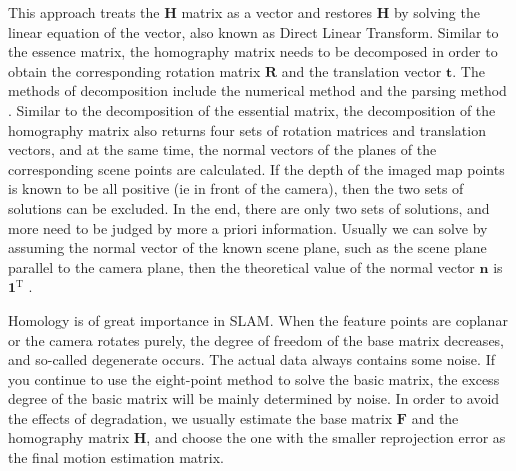 This approach treats the $\bm{H}$ matrix as a vector and restores $\bm{H}$ by solving the linear equation of the vector, also known as Direct Linear Transform. Similar to the essence matrix, the homography matrix needs to be decomposed in order to obtain the corresponding rotation matrix $\bm{R}$ and the translation vector $\bm{t}$. The methods of decomposition include the numerical method \textsuperscript{\cite{faugeras1988motion, Zhang1996}} and the parsing method \textsuperscript{\cite{malis2007deeper}}. Similar to the decomposition of the essential matrix, the decomposition of the homography matrix also returns four sets of rotation matrices and translation vectors, and at the same time, the normal vectors of the planes of the corresponding scene points are calculated. If the depth of the imaged map points is known to be all positive (ie in front of the camera), then the two sets of solutions can be excluded. In the end, there are only two sets of solutions, and more need to be judged by more a priori information. Usually we can solve by assuming the normal vector of the known scene plane, such as the scene plane parallel to the camera plane, then the theoretical value of the normal vector $\bm{n}$ is $\bm{1}^\mathrm{T}$ .

Homology is of great importance in SLAM. When the feature points are coplanar or the camera rotates purely, the degree of freedom of the base matrix decreases, and so-called degenerate occurs. The actual data always contains some noise. If you continue to use the eight-point method to solve the basic matrix, the excess degree of the basic matrix will be mainly determined by noise. In order to avoid the effects of degradation, we usually estimate the base matrix $\bm{F}$ and the homography matrix $\bm{H}$, and choose the one with the smaller reprojection error as the final motion estimation matrix.

